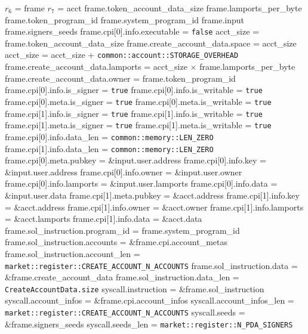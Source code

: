 \begin{algorithm}
\caption{CREATE-VAULT-ACCOUNT}
\begin{algorithmic}
  \INPUT $r_6$ = frame
  \INPUT $r_7$ = acct
  \REQUIRE frame.token\_account\_data\_size
  \REQUIRE frame.lamports\_per\_byte
  \REQUIRE frame.token\_program\_id
  \REQUIRE frame.system\_program\_id
  \REQUIRE frame.input
  \REQUIRE frame.signers\_seeds
  \REQUIRE frame.cpi[0].info.executable = \texttt{false}
  \STATE acct\_size = frame.token\_account\_data\_size
  \STATE frame.create\_account\_data.space = acct\_size
  \STATE acct\_size = acct\_size + \texttt{common::account::STORAGE\_OVERHEAD}
  \STATE frame.create\_account\_data.lamports =
    acct\_size $\times$ frame.lamports\_per\_byte
  \STATE frame.create\_account\_data.owner = frame.token\_program\_id
  \STATE frame.cpi[0].info.is\_signer = \texttt{true}
  \STATE frame.cpi[0].info.is\_writable = \texttt{true}
  \STATE frame.cpi[0].meta.is\_signer = \texttt{true}
  \STATE frame.cpi[0].meta.is\_writable = \texttt{true}
  \STATE frame.cpi[1].info.is\_signer = \texttt{true}
  \STATE frame.cpi[1].info.is\_writable = \texttt{true}
  \STATE frame.cpi[1].meta.is\_signer = \texttt{true}
  \STATE frame.cpi[1].meta.is\_writable = \texttt{true}
  \STATE frame.cpi[0].info.data\_len = \texttt{common::memory::LEN\_ZERO}
  \STATE frame.cpi[1].info.data\_len = \texttt{common::memory::LEN\_ZERO}
  \STATE frame.cpi[0].meta.pubkey = \&input.user.address
  \STATE frame.cpi[0].info.key = \&input.user.address
  \STATE frame.cpi[0].info.owner = \&input.user.owner
  \STATE frame.cpi[0].info.lamports = \&input.user.lamports
  \STATE frame.cpi[0].info.data = \&input.user.data
  \STATE frame.cpi[1].meta.pubkey = \&acct.address
  \STATE frame.cpi[1].info.key = \&acct.address
  \STATE frame.cpi[1].info.owner = \&acct.owner
  \STATE frame.cpi[1].info.lamports = \&acct.lamports
  \STATE frame.cpi[1].info.data = \&acct.data
  \STATE frame.sol\_instruction.program\_id = frame.system\_program\_id
  \STATE frame.sol\_instruction.accounts = \&frame.cpi.account\_metas
  \STATE frame.sol\_instruction.account\_len =
    \texttt{market::register::CREATE\_ACCOUNT\_N\_ACCOUNTS}
  \STATE frame.sol\_instruction.data = \&frame.create\_account\_data
  \STATE frame.sol\_instruction.data\_len = \texttt{CreateAccountData.size}
  \STATE syscall.instruction = \&frame.sol\_instruction
  \STATE syscall.account\_infos = \&frame.cpi.account\_infos
  \STATE syscall.account\_infos\_len =
    \texttt{market::register::CREATE\_ACCOUNT\_N\_ACCOUNTS}
  \STATE syscall.seeds = \&frame.signers\_seeds
  \STATE syscall.seeds\_len = \texttt{market::register::N\_PDA\_SIGNERS}
  \STATE {}
\ENDPROCEDURE
\end{algorithmic}
\end{algorithm}
